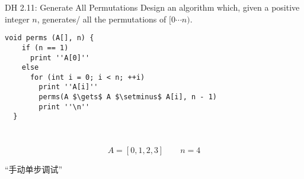 \begin{frame}{}
  \begin{description}
    \centering
    \item[\Large Generating All Permutations]
  \end{description}

\end{frame}

\begin{frame}[fragile]{}
  \begin{exampleblock}{DH 2.11: Generate All Permutations}
    Design an algorithm which, given a positive integer $n$,
    generates/ all the permutations of $[0 \cdots n)$.
  \end{exampleblock}

  \pause
  \begin{lstlisting}[style = Cstyle]
  void perms (A[], n) {
    if (n == 1)
      print ''A[0]''
    else 
      for (int i = 0; i < n; ++i)
        print ''A[i]''
        perms(A $\gets$ A $\setminus$ A[i], n - 1)
        print ''\n''
  }
  \end{lstlisting}

  \vspace{0.30cm}
  \pause
  \begin{center}
    \href{https://github.com/hengxin/problem-solving-class-lectures/blob/master/2019/2019-1/2019-1-5-data-structure/parts/code/generate-perms.c}{\texttt{}}
  \end{center}
\end{frame}

\begin{frame}{}
  \begin{columns}
      \begin{center}
	\href{https://github.com/hengxin/problem-solving-class-lectures/blob/master/2019/2019-1/2019-1-5-data-structure/parts/code/4perms.md}{\texttt{}}
      \end{center}
    \pause
  \end{columns}
\end{frame}

\begin{frame}{}
  \[
    A = [0,1,2,3] \qquad n = 4
  \]


  \begin{center}
    ``手动单步调试''
  \end{center}
\end{frame}

